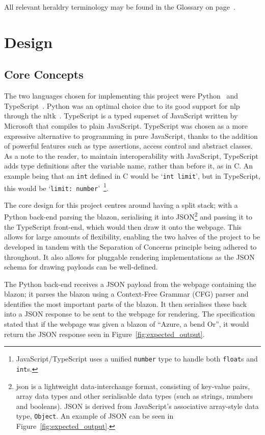 \documentclass[nobib, a4paper, twoside, justified]{tufte-book}
\makeatletter
\newcommand{\blazon}{\gls{blazon}\@\xspace}
\newcommand{\payload}{\gls{payload}\@\xspace}
\newcommand{\payloads}{\glspl{payload}\@\xspace}
\makeatother
\begin{document}
All relevant heraldry terminology may be found in the Glossary on page~\pageref{main}.

\chapter{Design}%
\label{cha:design}

\section{Core Concepts}%
\label{sec:core_concepts}

The two languages chosen for implementing this project were Python~\autocite{python} and
TypeScript~\autocite{typescript}. Python was an optimal choice due to its good support for
\gls{nlp} through the \gls{nltk}~\autocite{bird2004nltk}. TypeScript is a typed superset of
JavaScript written by Microsoft that compiles to plain JavaScript. TypeScript was chosen as a more
expressive alternative to programming in pure JavaScript, thanks to the addition of powerful
features such as type assertions, access control and abstract classes. As a note to the reader, to
maintain interoperability with JavaScript, TypeScript adds type definitions after the variable
name, rather than before it, as in C. An example being that an \texttt{int} defined in C would be
`\texttt{int limit}', but in TypeScript, this would be `\texttt{limit:
number}'~\footnote{JavaScript/TypeScript uses a unified \texttt{number} type to handle both
\texttt{float}s and \texttt{int}s.}.

The core design for this project centres around having a split stack; with a Python back-end
parsing the \blazon, serialising it into JSON\footnote{\gls{json} is a lightweight data-interchange
  format, consisting of key-value pairs, array data types and other serialisable data types (such
  as strings, numbers and booleans). JSON is derived from JavaScript's associative array-style data
type, \texttt{Object}. An example of JSON can be seen in Figure~\ref{fig:expected_output}.} and
passing it to the TypeScript front-end, which would then draw it onto the webpage. This allows for
large amounts of flexibility, enabling the two halves of the project to be developed in tandem with
the Separation of Concerns principle being adhered to throughout. It also allows for pluggable
rendering implementations as the JSON schema for drawing \payloads can be well-defined.

The Python back-end receives a JSON \payload from the webpage containing the \blazon; it parses the
\blazon using a Context-Free Grammar (CFG) parser and identifies the most important parts of the
\blazon. It then serialises these back into a JSON response to be sent to the webpage for rendering.
The specification stated that if the webpage was given a \blazon of ``Azure, a bend Or'', it would
return the JSON response seen in Figure~\ref{fig:expected_output}.
\end{document}
